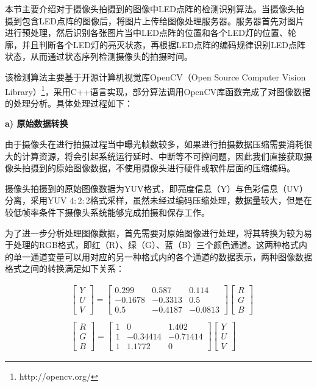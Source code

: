 本节主要介绍对于摄像头拍摄到的图像中LED点阵的检测识别算法。当摄像头拍摄到包含LED点阵的图像后，将图片上传给图像处理服务器。服务器首先对图片进行预处理，然后识别各张图片当中LED点阵的位置和各个LED灯的位置、轮廓，并且判断各个LED灯的亮灭状态，再根据LED点阵的编码规律识别LED点阵状态，从而通过状态序列检测摄像头的拍摄时间。

该检测算法主要基于开源计算机视觉库OpenCV（Open Source Computer Vision Library）\footnote{http://opencv.org/}，采用C++语言实现，部分算法调用OpenCV库函数完成了对图像数据的处理分析。具体处理过程如下：

\textbf{a) 原始数据转换}

由于摄像头在进行拍摄过程当中曝光帧数较多，如果进行拍摄数据压缩需要消耗很大的计算资源，将会引起系统运行延时、中断等不可控问题，因此我们直接获取摄像头拍摄到的原始图像数据，不使用摄像头进行硬件或软件层面的压缩编码。

摄像头拍摄到的原始图像数据为YUV格式，即亮度信息（Y）与色彩信息（UV）分离，采用YUV $4:2:2$格式采样，虽然未经过编码压缩处理，数据量较大，但是在较低帧率条件下摄像头系统能够完成拍摄和保存工作。

为了进一步分析处理图像数据，首先需要对原始图像进行处理，将其转换为较为易于处理的RGB格式，即红（R）、绿（G）、蓝（B）三个颜色通道。这两种格式内的单一通道变量可以用对应的另一种格式内的各个通道的数据表示，两种图像数据格式之间的转换满足如下关系\cite{rumball1992method}：

\begin{equation}
\begin{split}
& \left[
\begin{matrix}
Y \\
U \\
V
\end{matrix}
\right]
=
\left[
\begin{matrix}
0.299 & 0.587 & 0.114 \\
-0.1678 & -0.3313 & 0.5 \\
0.5 & -0.4187 & -0.0813
\end{matrix}
\right]
\left[
\begin{matrix}
R \\
G \\
B
\end{matrix}
\right] \\ \\
& \left[
\begin{matrix}
R \\
G \\
B
\end{matrix}
\right]
=
\left[
\begin{matrix}
1 & 0 & 1.402 \\
1 & -0.34414 & -0.71414 \\
1 & 1.1772 & 0
\end{matrix}
\right]
\left[
\begin{matrix}
Y \\
U \\
V
\end{matrix}
\right]
\end{split}
\label{rgb}
\end{equation}

